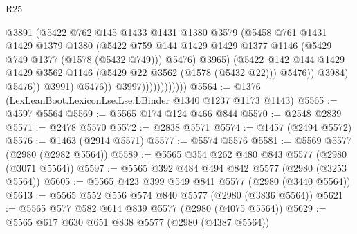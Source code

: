 \begin{lexlean}{R25}
\begin{coremodule}
                                        @3891
                                        (@5422
                                          @762
                                          @145
                                          @1433
                                          @1431
                                          @1380
                                          @3579
                                          (@5458
                                            @761
                                            @1431
                                            @1429
                                            @1379
                                            @1380
                                            (@5422
                                              @759
                                              @144
                                              @1429
                                              @1429
                                              @1377
                                              @1146
                                              (@5429 @749 @1377 (@1578 (@5432 @749)))
                                              @5476)
                                            @3965)
                                          (@5422
                                            @142
                                            @144
                                            @1429
                                            @1429
                                            @3562
                                            @1146
                                            (@5429 @22 @3562 (@1578 (@5432 @22)))
                                            @5476))
                                        @3984)
                                      @5476))
                                  @3991)
                                @5476))
                            @3997))))))))))))
@5564 := @1376 (LexLeanBoot.LexiconLse.Lse.LBinder @1340 @1237 @1173 @1143)
@5565 := @4597 @5564
@5569 := @5565 @174 @124 @466 @844
@5570 := @2548 @2839
@5571 := @2478 @5570
@5572 := @2838 @5571
@5574 := @1457 (@2494 @5572)
@5576 := @1463 (@2914 @5571)
@5577 := @5574 @5576
@5581 := @5569 @5577 (@2980 (@2982 @5564))
@5589 := @5565 @354 @262 @480 @843 @5577 (@2980 (@3071 @5564))
@5597 := @5565 @392 @484 @494 @842 @5577 (@2980 (@3253 @5564))
@5605 := @5565 @423 @399 @549 @841 @5577 (@2980 (@3440 @5564))
@5613 := @5565 @552 @556 @574 @840 @5577 (@2980 (@3836 @5564))
@5621 := @5565 @577 @582 @614 @839 @5577 (@2980 (@4075 @5564))
@5629 := @5565 @617 @630 @651 @838 @5577 (@2980 (@4387 @5564))

\end{coremodule}
\end{lexlean}
